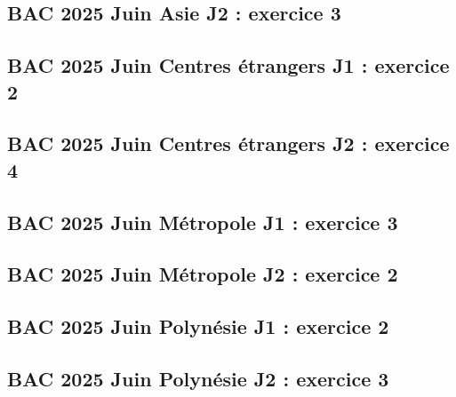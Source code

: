\documentclass[lang=fr,edition=teacher,layout=sheet]{mxbook}
\begin{document}
\begingroup\endgroup
\par\bigskip
{}\subsection*{BAC 2025 Juin Asie J2 : exercice 3}
\begingroup\endgroup
\par\bigskip
{}\subsection*{BAC 2025 Juin Centres étrangers J1 : exercice 2}
\begingroup\endgroup
\par\bigskip
{}\subsection*{BAC 2025 Juin Centres étrangers J2 : exercice 4}
\begingroup\endgroup
\par\bigskip
{}\subsection*{BAC 2025 Juin Métropole J1 : exercice 3}
\begingroup\endgroup
\par\bigskip
{}\subsection*{BAC 2025 Juin Métropole J2 : exercice 2}
\begingroup\endgroup
\par\bigskip
{}\subsection*{BAC 2025 Juin Polynésie J1 : exercice 2}
\begingroup\endgroup
\par\bigskip
{}\subsection*{BAC 2025 Juin Polynésie J2 : exercice 3}
\end{document}
